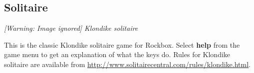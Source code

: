 \subsection{Solitaire}
{\centering\itshape
  [Warning: Image ignored] %
 \newline
Klondike solitaire
\par}

This is the classic Klondike solitaire game
for Rockbox.  Select \textbf{help }from the game menu to get an
explanation of what the keys do.  Rules for Klondike solitaire are
available from \url{http://www.solitairecentral.com/rules/klondike.html}.


